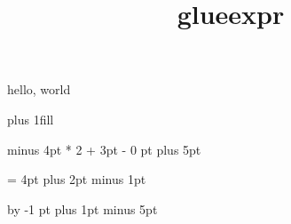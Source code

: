 \documentclass{amsart}
\title{glueexpr}
\begin{document}
\maketitle

hello, world

\the \glueexpr 1in plus 1fill

\the \glueexpr 1pt minus 4pt * 2 + 3pt - 0 pt plus 5pt


 = 4pt plus 2pt minus 1pt

\the{}

\advance{} by -1 pt plus 1pt minus 5pt

\the{}
\end{document}

